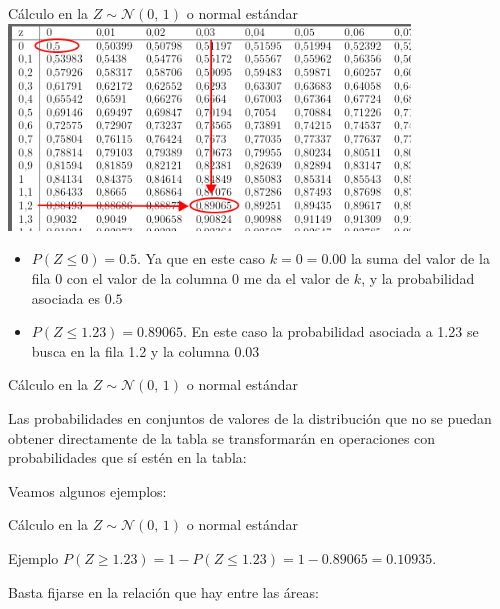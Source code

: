 \documentclass[11pt,handout]{beamer}
\begin{document}
\begin{frame}{Cálculo en la $Z \sim \mathcal{N}(0,\,1)$ o normal estándar}
\includegraphics[page=1,width=0.8\textwidth]{probabilidad/calculonormal.png}
\begin{itemize} [<+->]
    \item $P\left(Z\leq 0 \right)=0.5 $. Ya que en este caso $k=0=0.00$ la suma del valor de la fila 0 con el valor de la columna 0 me da el valor de $k$, y la probabilidad asociada es $0.5$
    \item $P\left(Z\leq 1.23 \right)= 0.89065$. En este caso la probabilidad asociada a 1.23 se busca en la fila 1.2 y la columna 0.03 
\end{itemize}



\end{frame}

\begin{frame}{Cálculo en la $Z \sim \mathcal{N}(0,\,1)$ o normal estándar} 
\begin{block}{}
    Las probabilidades en conjuntos de valores de la distribución que no se puedan obtener directamente de la tabla se transformarán en operaciones con probabilidades que sí estén en la tabla:
\end{block}
Veamos algunos ejemplos:
\end{frame}


\begin{frame}{Cálculo en la $Z \sim \mathcal{N}(0,\,1)$ o normal estándar}
\begin{block}{Ejemplo}
$P\left(Z\geq 1.23 \right)= 1 - P\left(Z\leq 1.23 \right) = 1 - 0.89065= 0.10935$.
\end{block}
Basta fijarse en la relación que hay entre las áreas:
\begin{center}
    
\end{center}

\begin{columns}
\begin{column}{0.5\textwidth}
 
\end{column}
\begin{column}{0.5\textwidth}
 
\end{column}
\end{columns}
\end{frame}
\end{document}
